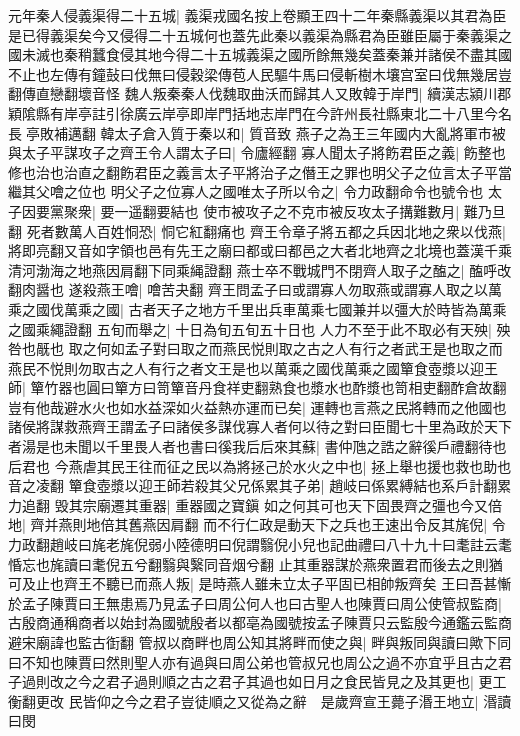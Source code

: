 元年秦人侵義渠得二十五城|{
	義渠戎國名按上卷顯王四十二年秦縣義渠以其君為臣是已得義渠矣今又侵得二十五城何也蓋先此秦以義渠為縣君為臣雖臣屬于秦義渠之國未滅也秦稍蠶食侵其地今得二十五城義渠之國所餘無幾矣蓋秦兼并諸侯不盡其國不止也左傳有鐘鼔曰伐無曰侵穀梁傳苞人民驅牛馬曰侵斬樹木壤宫室曰伐無幾居豈翻傳直戀翻壞音怪}
魏人叛秦秦人伐魏取曲沃而歸其人又敗韓于岸門|{
	續漢志潁川郡穎隂縣有岸亭註引徐廣云岸亭即岸門括地志岸門在今許州長社縣東北二十八里今名長亭敗補邁翻}
韓太子倉入質于秦以和|{
	質音致}
燕子之為王三年國内大亂將軍市被與太子平謀攻子之齊王令人謂太子曰|{
	令廬經翻}
寡人聞太子將飭君臣之義|{
	飭整也修也治也治直之翻飭君臣之義言太子平將治子之僭王之罪也明父子之位言太子平當繼其父噲之位也}
明父子之位寡人之國唯太子所以令之|{
	令力政翻命令也號令也}
太子因要黨聚衆|{
	要一遥翻要結也}
使市被攻子之不克市被反攻太子搆難數月|{
	難乃旦翻}
死者數萬人百姓恫恐|{
	恫它紅翻痛也}
齊王令章子將五都之兵因北地之衆以伐燕|{
	將即亮翻又音如字領也邑有先王之廟曰都或曰都邑之大者北地齊之北境也蓋漢千乘清河渤海之地燕因肩翻下同乘䋲證翻}
燕士卒不戰城門不閉齊人取子之醢之|{
	醢呼改翻肉醤也}
遂殺燕王噲|{
	噲苦夬翻}
齊王問孟子曰或謂寡人勿取燕或謂寡人取之以萬乘之國伐萬乘之國|{
	古者天子之地方千里出兵車萬乘七國兼并以彊大於時皆為萬乘之國乘繩證翻}
五旬而舉之|{
	十日為旬五旬五十日也}
人力不至于此不取必有天殃|{
	殃咎也旤也}
取之何如孟子對曰取之而燕民悦則取之古之人有行之者武王是也取之而燕民不悦則勿取古之人有行之者文王是也以萬乘之國伐萬乘之國簞食壺漿以迎王師|{
	簞竹器也圓曰簞方曰笥簞音丹食祥吏翻熟食也漿水也酢漿也笥相吏翻酢倉故翻}
豈有他哉避水火也如水益深如火益熱亦運而已矣|{
	運轉也言燕之民將轉而之他國也}
諸侯將謀救燕齊王謂孟子曰諸侯多謀伐寡人者何以待之對曰臣聞七十里為政於天下者湯是也未聞以千里畏人者也書曰徯我后后來其蘇|{
	書仲虺之誥之辭徯戶禮翻待也后君也}
今燕虐其民王往而征之民以為將拯己於水火之中也|{
	拯上舉也援也救也助也音之凌翻}
簞食壺漿以迎王師若殺其父兄係累其子弟|{
	趙岐曰係累縛結也系戶計翻累力追翻}
毁其宗廟遷其重器|{
	重器國之寶鎭}
如之何其可也天下固畏齊之彊也今又倍地|{
	齊并燕則地倍其舊燕因肩翻}
而不行仁政是動天下之兵也王速出令反其旄倪|{
	令力政翻趙岐曰旄老旄倪弱小陸德明曰倪謂翳倪小兒也記曲禮曰八十九十曰耄註云耄惛忘也旄讀曰耄倪五兮翻翳與繄同音烟兮翻}
止其重器謀於燕衆置君而後去之則猶可及止也齊王不聽已而燕人叛|{
	是時燕人雖未立太子平固已相帥叛齊矣}
王曰吾甚慚於孟子陳賈曰王無患焉乃見孟子曰周公何人也曰古聖人也陳賈曰周公使管叔監商|{
	古殷商通稱商者以始封為國號殷者以都亳為國號按孟子陳賈只云監殷今通鑑云監商避宋廟諱也監古衘翻}
管叔以商畔也周公知其將畔而使之與|{
	畔與叛同與讀曰歟下同}
曰不知也陳賈曰然則聖人亦有過與曰周公弟也管叔兄也周公之過不亦宜乎且古之君子過則改之今之君子過則順之古之君子其過也如日月之食民皆見之及其更也|{
	更工衡翻更改}
民皆仰之今之君子豈徒順之又從為之辭　是歲齊宣王薨子湣王地立|{
	湣讀曰閔}


